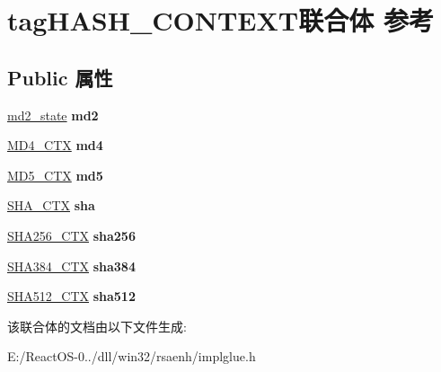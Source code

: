 \hypertarget{uniontag_h_a_s_h___c_o_n_t_e_x_t}{}\section{tag\+H\+A\+S\+H\+\_\+\+C\+O\+N\+T\+E\+X\+T联合体 参考}
\label{uniontag_h_a_s_h___c_o_n_t_e_x_t}
\subsection*{Public 属性}
\begin{DoxyCompactItemize}
\item 
\mbox{\label{uniontag_h_a_s_h___c_o_n_t_e_x_t_a41ce6ab5dadd1f0a0ada197825037390}} 
\hyperlink{structtag__md2__state}{md2\+\_\+state} {\bfseries md2}
\item 
\mbox{\label{uniontag_h_a_s_h___c_o_n_t_e_x_t_af692433f56bc3fb5bb88d39500527064}} 
\hyperlink{struct_m_d4___c_t_x}{M\+D4\+\_\+\+C\+TX} {\bfseries md4}
\item 
\mbox{\label{uniontag_h_a_s_h___c_o_n_t_e_x_t_a78c7f00ce0ba99a3a5584d4f98ff9a04}} 
\hyperlink{struct_m_d5___c_t_x}{M\+D5\+\_\+\+C\+TX} {\bfseries md5}
\item 
\mbox{\label{uniontag_h_a_s_h___c_o_n_t_e_x_t_a345c6912d60473f62cfa75e2d8a72252}} 
\hyperlink{struct_s_h_a___c_t_x}{S\+H\+A\+\_\+\+C\+TX} {\bfseries sha}
\item 
\mbox{\label{uniontag_h_a_s_h___c_o_n_t_e_x_t_a7fddd89da38a8c4fb7a6d74ecdc36c45}} 
\hyperlink{struct___s_h_a256___c_t_x}{S\+H\+A256\+\_\+\+C\+TX} {\bfseries sha256}
\item 
\mbox{\label{uniontag_h_a_s_h___c_o_n_t_e_x_t_adb51803ac487133d274976adfcbf2ee8}} 
\hyperlink{struct___s_h_a512___c_t_x}{S\+H\+A384\+\_\+\+C\+TX} {\bfseries sha384}
\item 
\mbox{\label{uniontag_h_a_s_h___c_o_n_t_e_x_t_a06cfdc1e715e64ee72fd5c824eeb91fd}} 
\hyperlink{struct___s_h_a512___c_t_x}{S\+H\+A512\+\_\+\+C\+TX} {\bfseries sha512}
\end{DoxyCompactItemize}


该联合体的文档由以下文件生成\+:\begin{DoxyCompactItemize}
\item 
E\+:/\+React\+O\+S-\/0../dll/win32/rsaenh/implglue.\+h\end{DoxyCompactItemize}
